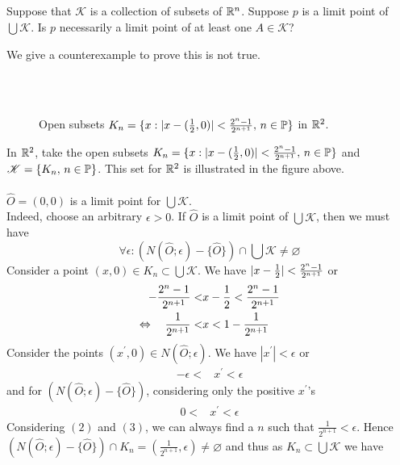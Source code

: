 \subsection{}
\begin{tcolorbox}

Suppose that $\mathscr{K}$ is a collection of subsets of $\mathbb{R}^n$. Suppose $p$ is a limit point of $\bigcup \mathscr{K}$. Is $p$ necessarily a limit point of at least one $A\in \mathscr{K}$?
\end{tcolorbox}
We give a counterexample to prove this is not true.\\\
\begin{figure}[H]%
    \centering
\\
\caption{Open subsets $K_n=\{x:|x-(\frac{1}{2},0)|< \frac{2^n-1  }{2^{n+1}},\, n\in\mathbb{P}\}$ in $\mathbb{R}^2$.}
\label{fig:fig_p8a}
\end{figure}
In $\mathbb{R}^2$, take the open subsets $K_n=\{x:|x-(\frac{1}{2},0)|<\frac{2^n-1}{2^{n+1}},\, n\in \mathbb{P}\}$ and $\mathscr{K}=\{K_n,\,n\in \mathbb{P} \}$. This set for $\mathbb{R}^2$ is illustrated in the figure above.\\\\
$\hat{O}=(0,0)$ is a limit point for $\bigcup \mathscr{K}$. \\
Indeed, choose an arbitrary $\epsilon >0$. If $\hat{O}$ is a limit point of $\bigcup \mathscr{K}$, then we must have 
$$\forall \epsilon :\left(N(\hat{O};\epsilon)-\{\hat{O}\}\right)\cap \bigcup \mathscr{K}\neq \varnothing$$ Consider a point $(x,0)\in K_n\subset \bigcup \mathscr{K} $. We have $|x-\frac{1}{2}|<\frac{2^n-1}{2^{n+1}}$ or 
\begin{align}
-\frac{2^n-1}{2^{n+1}}<&x-\frac{1}{2}<\frac{2^n-1}{2^{n+1}}\\
\Leftrightarrow\quad  \frac{1}{2^{n+1}}<&x<1-\frac{1}{2^{n+1}}
\end{align}
Consider the points $(x^{'},0)\in N(\hat{O};\epsilon)$. We have $|x^{'}|<\epsilon$ or 
\begin{align*}
-\epsilon<&x^{'}<\epsilon
\end{align*}
and for $\left(N(\hat{O};\epsilon)-\{\hat{O}\}\right)$, considering only the positive $x^{'}$'s
\begin{align}
0<&x^{'}<\epsilon
\end{align}
Considering $(2)$ and $(3)$, we can always find a $n$ such that $\frac{1}{2^{n+1}}<\epsilon$. Hence  $\left(N(\hat{O};\epsilon)-\{\hat{O}\}\right)\cap K_n= \left(\frac{1}{2^{n+1}},\epsilon\right)\neq \varnothing$ and thus as $K_n\subset  \bigcup \mathscr{K}$ we have
